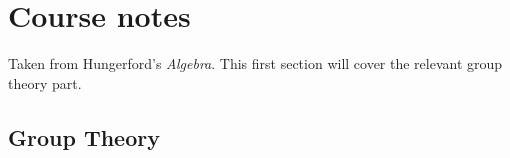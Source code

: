 \chapter{Course notes}
Taken from Hungerford's \emph{Algebra}. This first section will cover the
relevant group theory part.
\section{Group Theory}

